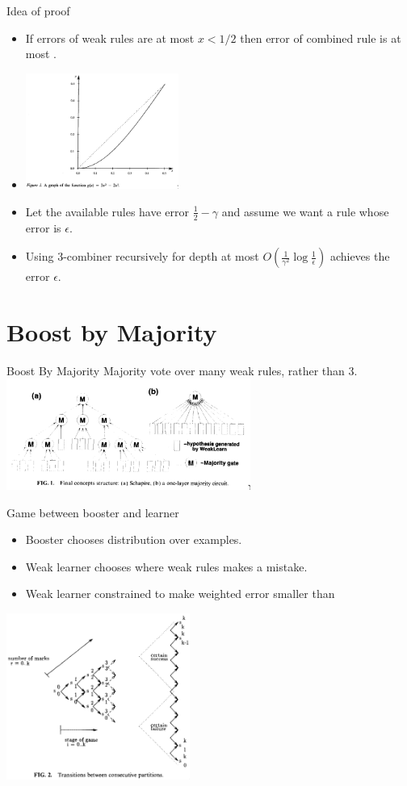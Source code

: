 \documentclass[handout]{beamer}
\begin{document}
\begin{frame}{Idea of proof}
  \begin{itemize}
  \item If errors of weak rules are at most $x<1/2$ then error of combined rule is at most .
  \item   \includegraphics[width=5cm]{figures/SchapireBoostg-graph.png}
  \item Let the available rules have error $\frac{1}{2}-\gamma$ and assume we want a rule whose error is $\epsilon$.
  \item Using 3-combiner recursively for depth at most $O(\frac{1}{\gamma^2} \log \frac{1}{\epsilon})$
  achieves the error $\epsilon$.
  \end{itemize}
  \end{frame}

\section{Boost by Majority}
\begin{frame}{Boost By Majority}
  Majority vote over many weak rules, rather than 3.
  ~\\
\includegraphics[width=8cm]{figures/BBMvsSchapire.png}
\end{frame}

\begin{frame}{Game between booster and learner}
  \begin{itemize}
  \item Booster chooses distribution over examples.
  \item Weak learner chooses where weak rules makes a mistake.
  \item Weak learner constrained to make weighted error smaller than 
  \end{itemize}
\includegraphics[width=6cm]{figures/BBMFigure.png}
\end{frame}
\end{document}
